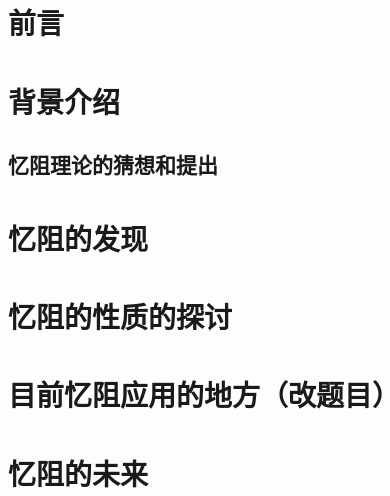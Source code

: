 \documentclass[UTF8]{article}
\begin{document}
 


\section{前言}
\section{背景介绍}
\subsection{忆阻理论的猜想和提出}
\section{忆阻的发现}
\subsection{}
\subsection{}

\section{忆阻的性质的探讨}

\section{目前忆阻应用的地方（改题目）}
\section{忆阻的未来}
\end{document}
